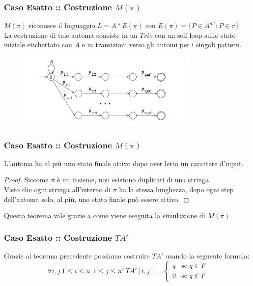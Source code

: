 \documentclass{beamer}
\begin{document}
\begin{frame}
\frametitle{Caso Esatto :: Costruzione $M(\pi)$}

$M(\pi)$ riconosce il linguaggio $L = A*E(\pi)$ con $E(\pi) = \{ P \in A^{m'} ; P \in \pi   \}$\\
La costruzione di tale automa consiste in un $Trie$ con un self loop sullo stato iniziale etichettato con $A$ e $m$ transizioni verso gli automi per i singoli pattern.

\begin{figure}[p]
    \includegraphics[width=0.8\textwidth]{exact2D.png}
\end{figure}

\end{frame}

\begin{frame}
\frametitle{Caso Esatto :: Costruzione $M(\pi)$}

\begin{theorem}[]
L'automa ha al più uno stato finale attivo dopo aver letto un carattere d'input.
\end{theorem}


\begin{proof}
Siccome $\pi$ è un insieme, non esistono duplicati di una stringa.\\
Visto che ogni stringa all'interno di $\pi$ ha la stessa lunghezza, dopo ogni step dell'automa solo, al più, uno stato finale può essere attivo.
\end{proof}
Questo teorema vale grazie a come viene eseguita la simulazione di $M(\pi)$.

\end{frame}

\begin{frame}
\frametitle{Caso Esatto :: Costruzione $TA'$}
Grazie al teorema precedente possiamo costruire $TA'$ usando la seguente formula:
\begin{equation*}
\forall  i,j\ 1\leq i \leq n, 1 \leq j \leq n'\
TA'[i,j]= 
\begin{cases} q & \text{se $q\in F$}
\\
0 &\text{se $q \not\in F$}
\end{cases}
\end{equation*}


\end{frame}
\end{document}
